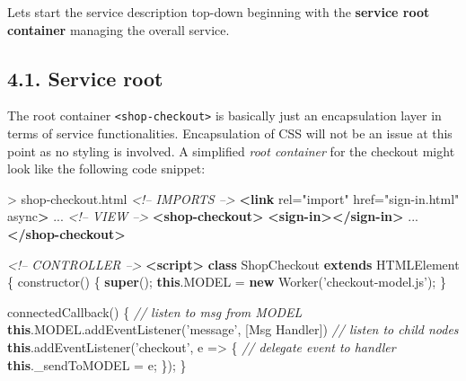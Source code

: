 \documentclass[]{article}
\newenvironment{Shaded}{}{}
\newcommand{\KeywordTok}[1]{\textcolor[rgb]{0.00,0.44,0.13}{\textbf{{#1}}}}
\newcommand{\StringTok}[1]{\textcolor[rgb]{0.25,0.44,0.63}{{#1}}}
\newcommand{\CommentTok}[1]{\textcolor[rgb]{0.38,0.63,0.69}{\textit{{#1}}}}
\newcommand{\OtherTok}[1]{\textcolor[rgb]{0.00,0.44,0.13}{{#1}}}
\newcommand{\VariableTok}[1]{\textcolor[rgb]{0.10,0.09,0.49}{{#1}}}
\newcommand{\OperatorTok}[1]{\textcolor[rgb]{0.40,0.40,0.40}{{#1}}}
\newcommand{\AttributeTok}[1]{\textcolor[rgb]{0.49,0.56,0.16}{{#1}}}
\newcommand{\NormalTok}[1]{{#1}}
\begin{document}
Lets start the service description top-down beginning with the
\textbf{service root container} managing the overall service.

\subsection{4.1. Service root}\label{service-root}

The root container \texttt{\textless{}shop-checkout\textgreater{}} is
basically just an encapsulation layer in terms of service
functionalities. Encapsulation of CSS will not be an issue at this point
as no styling is involved. A simplified \emph{root container} for the
checkout might look like the following code snippet:

\begin{Shaded}
\begin{Highlighting}[]
\NormalTok{> shop-checkout.html}
\CommentTok{<!-- IMPORTS -->}
\KeywordTok{<link}\OtherTok{ rel=}\StringTok{"import"}\OtherTok{ href=}\StringTok{"sign-in.html"}\OtherTok{ async}\KeywordTok{>}
\NormalTok{...}
\CommentTok{<!-- VIEW -->}
\KeywordTok{<shop-checkout>}
  \KeywordTok{<sign-in></sign-in>}
  \NormalTok{...}
\KeywordTok{</shop-checkout>}

\CommentTok{<!-- CONTROLLER -->}
\KeywordTok{<script>}
\KeywordTok{class} \NormalTok{ShopCheckout }\KeywordTok{extends} \NormalTok{HTMLElement }\OperatorTok{\{}
  \AttributeTok{constructor}\NormalTok{() }\OperatorTok{\{}
    \KeywordTok{super}\NormalTok{()}\OperatorTok{;}
    \KeywordTok{this}\NormalTok{.}\AttributeTok{MODEL} \OperatorTok{=} \KeywordTok{new} \AttributeTok{Worker}\NormalTok{(}\StringTok{'checkout-model.js'}\NormalTok{)}\OperatorTok{;}
  \OperatorTok{\}}
  
  \AttributeTok{connectedCallback}\NormalTok{() }\OperatorTok{\{}
    \CommentTok{// listen to msg from MODEL}
    \KeywordTok{this}\NormalTok{.}\VariableTok{MODEL}\NormalTok{.}\AttributeTok{addEventListener}\NormalTok{(}\StringTok{'message'}\OperatorTok{,} \NormalTok{[Msg Handler])}
    \CommentTok{// listen to child nodes}
    \KeywordTok{this}\NormalTok{.}\AttributeTok{addEventListener}\NormalTok{(}\StringTok{'checkout'}\OperatorTok{,} \NormalTok{e }\OperatorTok{=>} \OperatorTok{\{}
      \CommentTok{// delegate event to handler}
      \KeywordTok{this}\NormalTok{.}\AttributeTok{_sendToMODEL} \OperatorTok{=} \NormalTok{e}\OperatorTok{;} 
    \OperatorTok{\}}\NormalTok{)}\OperatorTok{;}
  \OperatorTok{\}}
  

\end{Highlighting}
\end{Shaded}
\end{document}

